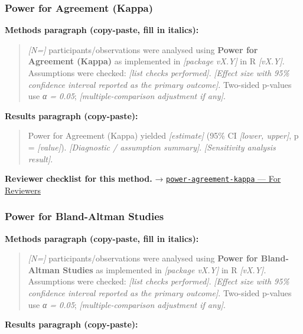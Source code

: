 \documentclass[
]{article}
\begin{document}
\subsubsection{Power for Agreement
(Kappa)}\label{power-for-agreement-kappa}

\textbf{Methods paragraph (copy-paste, fill in italics):}

\begin{quote}
\emph{{[}N={]}} participants/observations were analysed using
\textbf{Power for Agreement (Kappa)} as implemented in \emph{{[}package
vX.Y{]}} in R \emph{{[}vX.Y{]}}. Assumptions were checked: \emph{{[}list
checks performed{]}}. \emph{{[}Effect size with 95\% confidence interval
reported as the primary outcome{]}}. Two-sided p-values use \emph{α =
0.05}; \emph{{[}multiple-comparison adjustment if any{]}}.
\end{quote}

\textbf{Results paragraph (copy-paste):}

\begin{quote}
Power for Agreement (Kappa) yielded \emph{{[}estimate{]}} (95\% CI
\emph{{[}lower, upper{]}}, p = \emph{{[}value{]}}). \emph{{[}Diagnostic
/ assumption summary{]}}. \emph{{[}Sensitivity analysis result{]}}.
\end{quote}

\textbf{Reviewer checklist for this method.} →
\href{../chapters/05-power/power-agreement-kappa.Rmd\#for-reviewers}{\texttt{power-agreement-kappa}
--- For Reviewers}

\subsubsection{Power for Bland-Altman
Studies}\label{power-for-bland-altman-studies}

\textbf{Methods paragraph (copy-paste, fill in italics):}

\begin{quote}
\emph{{[}N={]}} participants/observations were analysed using
\textbf{Power for Bland-Altman Studies} as implemented in
\emph{{[}package vX.Y{]}} in R \emph{{[}vX.Y{]}}. Assumptions were
checked: \emph{{[}list checks performed{]}}. \emph{{[}Effect size with
95\% confidence interval reported as the primary outcome{]}}. Two-sided
p-values use \emph{α = 0.05}; \emph{{[}multiple-comparison adjustment if
any{]}}.
\end{quote}

\textbf{Results paragraph (copy-paste):}
\end{document}
